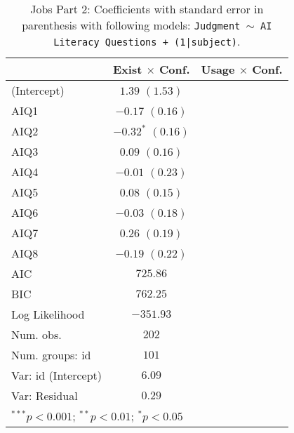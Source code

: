 \begin{table}[hpbt]
\begin{center}
\small
\begin{tabular}{l c c}
\hline
 & Exist $\times$ Conf. & Usage $\times$ Conf. \\
\hline
(Intercept) & $1.39$\; $(1.53)$ &  \\
AIQ1 & $-0.17$\; $(0.16)$ &  \\
AIQ2 & $\mathbf{-0.32^{*}}$\; $(0.16)$ &  \\
AIQ3 & $0.09$\; $(0.16)$ &  \\
AIQ4 & $-0.01$\; $(0.23)$ & \\
AIQ5 & $0.08$\; $(0.15)$ &  \\
AIQ6 & $-0.03$\; $(0.18)$ &  \\
AIQ7 & $0.26$\; $(0.19)$ &  \\
AIQ8 & $-0.19$\; $(0.22)$ &  \\
\hline
AIC                 & $725.86$    \\
BIC                 & $762.25$    \\
Log Likelihood      & $-351.93$   \\
Num. obs.           & $202$       \\
Num. groups: id     & $101$       \\
Var: id (Intercept) & $6.09$      \\
Var: Residual       & $0.29$      \\
\hline
\multicolumn{3}{l}{\scriptsize{$^{***}p<0.001$; $^{**}p<0.01$; $^{*}p<0.05$}}
\end{tabular}
\caption{Jobs Part 2: Coefficients with standard error in parenthesis with following models: \texttt{Judgment $\sim$ AI Literacy Questions + (1|subject)}.}
\label{tab:reasoning-factors-questionnaires}
\end{center}
\end{table}